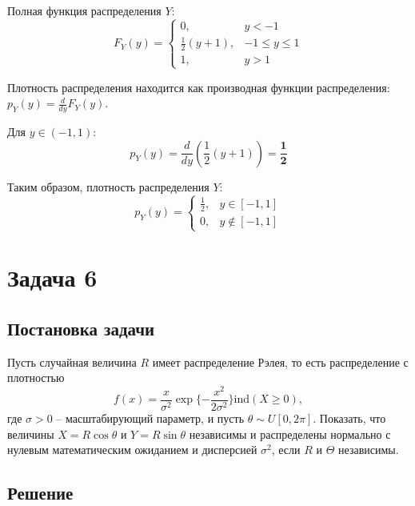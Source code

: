 \documentclass[a4paper,14pt]{extarticle}
\begin{document}
            Полная функция распределения $Y$:
            $$
            \boxed{F_Y(y) =
                \begin{cases}
                    0, & y < -1 \\
                    \frac{1}{2}(y + 1), & -1 \le y \le 1 \\
                    1, & y > 1
                \end{cases}}
            $$
            
            Плотность распределения находится как производная функции распределения: $p_Y(y) = \frac{d}{dy} F_Y(y)$.
            
            Для $y \in (-1, 1)$:
            $$
            p_Y(y) = \frac{d}{dy} \left( \frac{1}{2}(y + 1) \right) = \mathbf{\frac{1}{2}}
            $$
            
            Таким образом, плотность распределения $Y$:
            $$
            \boxed{p_Y(y) = \begin{cases}
                                \frac{1}{2}, & y \in [-1, 1] \\
                                0, & y \notin [-1, 1]
            \end{cases}}
            $$
            
    
    
    \section*{Задача 6}
        
        \subsection*{Постановка задачи}
            Пусть случайная величина $R$ имеет распределение Рэлея, то есть распределение с плотностью
            \[f(x) = \frac{x}{\sigma^2} \exp \{- \frac{x^2}{2\sigma^2}\} \mathrm{ind}(X \ge 0),\]
            где $\sigma > 0$ -- масштабирующий параметр, и пусть $\theta \sim  U[0, 2\pi]$.
            Показать, что величины $X = R\cos\theta$ и $Y = R\sin\theta$ независимы и распределены нормально с нулевым математическим ожиданием и дисперсией $\sigma^2$, если $R$ и $\Theta$ независимы.
        
        \subsection*{Решение}
            
\end{document}
